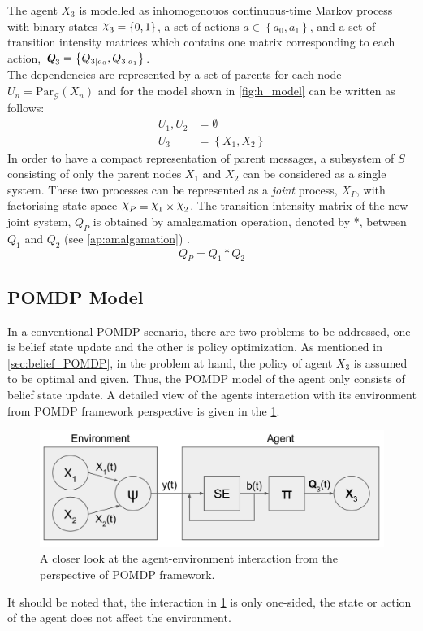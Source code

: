 The agent  $ X_{3} $ is modelled as inhomogenouos continuous-time Markov process with binary states $ \rchi_{3} = \left\lbrace 0, 1 \right\rbrace  $, a set of actions $ a \in \left\lbrace a_0, a_1\right\rbrace  $, and a set of transition intensity matrices which contains one matrix corresponding to each action, $ \textit{\textbf{Q}}_{3} = \left\lbrace Q_{3\mid a_{0}}, Q_{3\mid a_{1}} \right\rbrace $.\\
The dependencies are represented by a set of parents for each node $ U_{n} = \mathrm{Par}_{\mathcal{G}}(X_n) $ and for the model shown in \cref{fig:h_model} can be written as follows:
\begin{align*}
U_{1}, U_{2} & = \emptyset \\
U_{3} & = \left\lbrace X_1, X_2 \right\rbrace 
\end{align*}
In order to have a compact representation of parent messages, a subsystem of $ S $ consisting of only the parent nodes $ X_1 $ and $ X_2 $ can be considered as a single system. These two processes can be represented as a \textit{joint} process, $ X_P $, with factorising state space $ \rchi_{P} = \rchi_1 \times \rchi_2  $. The transition intensity matrix of the new joint system, $ Q_P $ is obtained by amalgamation operation, denoted by *, between $ Q_{1} $ and  $ Q_{2} $ (see \cref{ap:amalgamation}) \cite{Nodelman1995}.
\begin{equation}
Q_P = Q_{1} * Q_{2}
\end{equation}

\subsection{POMDP Model}
\label{sec:exp_pomdp_model}
In a conventional POMDP scenario, there are two problems to be addressed, one is belief state update and the other is policy optimization. As mentioned in \cref{sec:belief_POMDP}, in the problem at hand, the policy of agent $ X_3 $ is assumed to be optimal and given. Thus, the POMDP model of the agent only consists of belief state update. A detailed view of the agents interaction with its environment from POMDP framework perspective is given in the \cref{fig:POMDP_pers}. \\
\begin{figure}[H]
	\begin{center}
		\includegraphics[width=.75\textwidth]{figures/POMDP_graph}
		\caption{A closer look at the agent-environment interaction from the perspective of POMDP framework.}
		\label{fig:POMDP_pers}
	\end{center}
\end{figure}
It should be noted that, the interaction in \cref{fig:POMDP_pers} is only one-sided, the state or action of the agent does not affect the environment.
